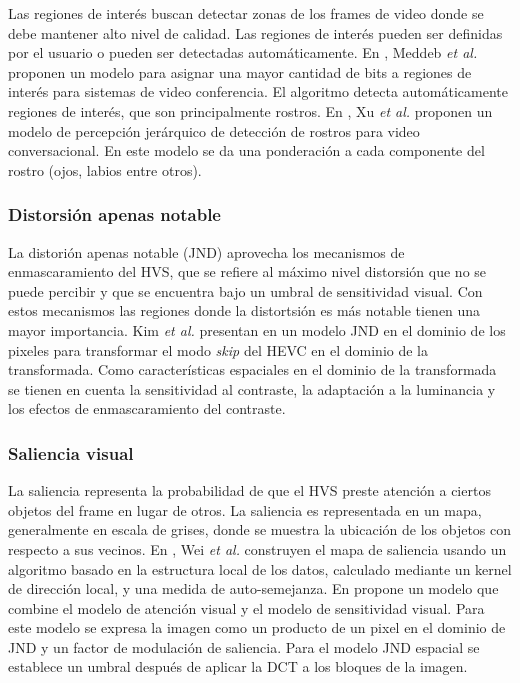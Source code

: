 Las regiones de inter\'es buscan detectar zonas de los frames de video donde se debe mantener alto nivel de calidad. Las regiones de inter\'es pueden ser definidas por el usuario o pueden ser detectadas autom\'aticamente. En \cite{meddeb2014region}, Meddeb \textit{et al.} proponen un modelo para asignar una mayor cantidad de bits a regiones de inter\'es para sistemas de video conferencia. El algoritmo detecta autom\'aticamente regiones de inter\'es, que son principalmente rostros. En \cite{6782435}, Xu \textit{et al.} proponen un modelo de percepci\'on jer\'arquico de detecci\'on de rostros para video conversacional. En este modelo se da una ponderaci\'on a cada componente del rostro (ojos, labios entre otros).

\subsubsection{Distorsi\'on apenas notable}
La distori\'on apenas notable (JND) aprovecha los mecanismos de enmascaramiento del HVS, que se refiere al m\'aximo nivel distorsi\'on que no se puede percibir y que se encuentra bajo un umbral de sensitividad visual. Con estos mecanismos las regiones donde la distortsi\'on es m\'as notable tienen una mayor importancia. Kim \textit{et al.} presentan en \cite{kim_hevc-compliant_2015} un modelo JND en el dominio de los pixeles para transformar el modo \textit{skip} del HEVC en el dominio de la transformada. Como caracter\'isticas espaciales en el dominio de la transformada se tienen en cuenta la sensitividad al contraste, la adaptaci\'on a la luminancia y los efectos de enmascaramiento del contraste.

\subsubsection{Saliencia visual}
La saliencia representa la probabilidad de que el HVS preste atenci\'on a ciertos objetos del frame en lugar de otros. La saliencia es representada en un mapa, generalmente en escala de grises, donde se muestra la ubicaci\'on de los objetos con respecto a sus vecinos. En \cite{saliency}, Wei \textit{et al.} construyen el mapa de saliencia usando un algoritmo basado en la estructura local de los datos, calculado mediante un kernel de direcci\'on local, y  una medida de auto-semejanza. En \cite{wang_perceptual_2014} propone un modelo que combine el modelo de atenci\'on visual y el modelo de sensitividad visual. Para este modelo se expresa la imagen como un producto de un pixel en el dominio de JND y un factor de modulaci\'on de saliencia. Para el modelo JND espacial se establece un umbral despu\'es de aplicar la DCT a los bloques de la imagen.

